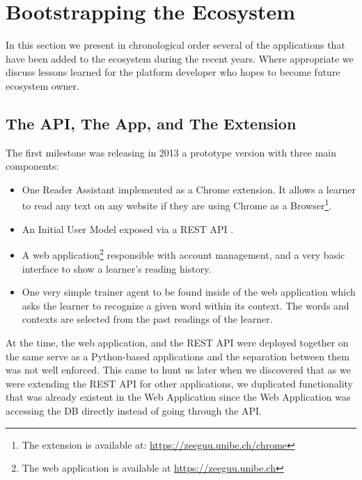 

\section {Bootstrapping the Ecosystem}

In this section we present in chronological order several of the applications that have been added to the ecosystem during the recent years. Where appropriate we discuss lessons learned for the platform developer who hopes to become future ecosystem owner. 

\subsection {The API, The App, and The Extension}
The first milestone was releasing in 2013 a prototype version with three main components: 

\begin{itemize}
	\item One Reader Assistant implemented as a Chrome extension. It allows a learner to read any text on any website if they are using Chrome as a Browser\footnote{The extension is available at: \url{https://zeeguu.unibe.ch/chrome}}. 

	\item An Initial User Model exposed via a REST API  \cite{Lung16zeeguu}. 

	\item A web application\footnote{The web application is available at \url{https://zeeguu.unibe.ch}} responsible with account management, and a very basic interface to show a learner's reading history. 

	\item One very simple trainer agent to be found inside of the web application which asks the learner to recognize a given word within its context. The words and contexts are selected from the past readings of the learner.

\end{itemize}

At the time, the web application, and the REST API were deployed together on the same serve as a Python-based applications and the separation between them was not well enforced. This came to hunt us later when we discovered that as we were extending the REST API for other applications, we duplicated functionality that was already existent in the Web Application since the Web Application was accessing the DB directly instead of going through the API.

